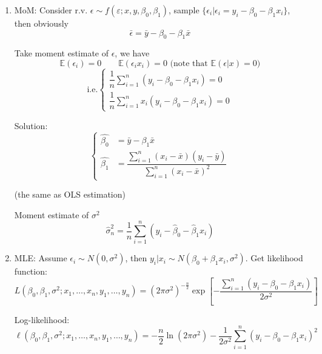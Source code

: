 \begin{enumerate}
    \item MoM: Consider r.v. $\epsilon\sim f(\varepsilon;x,y,\beta_0,\beta_1)$, sample $\{\epsilon_i|\epsilon_i=y_i-\beta_0-\beta_1x_i\}$, then obviously
        \begin{equation}\bar{\epsilon}=\bar{y}-\beta_0-\beta_1\bar{x}\end{equation}

        Take moment estimate of $\epsilon$, we have 
        \begin{equation}\mathbb{E}(\epsilon_i)=0\qquad \mathbb{E}(\epsilon_i x_i)=0\text{ (note that }\mathbb{E}(\epsilon|x)=0)\end{equation}
        \begin{equation}\text{i.e.}\begin{cases}
            
            \dfrac{1}{n}\sum_{i=1}^n(y_i-\beta_0-\beta_1x_i)=0\\
            \dfrac{1}{n}\sum_{i=1}^nx_i(y_i-\beta_0-\beta_1x_i)=0
        \end{cases}\end{equation}

        Solution:
        \begin{equation}\begin{cases}
            \hat{\beta_0}&=\bar{y}-\beta_1\bar{x}\\
            \hat{\beta_1}&=\dfrac{\sum_{i=1}^n(x_i-\bar{x})(y_i-\bar{y})}{\sum_{i=1}^n(x_i-\bar{x})^2}
        \end{cases}\end{equation}

        (the same as OLS estimation)

        Moment estimate of $\sigma^2$
        \begin{equation}\hat{\sigma}^2_n=\frac{1}{n}\sum_{i=1}^n(y_i-\hat{\beta}_0-\hat{\beta}_1x_i)\end{equation}

    \item MLE: Assume $\epsilon_i\sim N(0,\sigma^2)$, then $y_i|x_i\sim N(\beta_0+\beta_1x_i,\sigma^2)$. Get likelihood function:
        \begin{equation}
            L(\beta_0,\beta_1,\sigma^2;x_1,\ldots,x_n,y_1,\ldots,y_n)=(2\pi\sigma^2)^{-\frac{n}{2}}\exp\left[-\frac{\sum_{i=1}^n(y_i-\beta_0-\beta_1x_i)}{2\sigma^2}\right]  
        \end{equation}

    Log-likelihood:
    \begin{equation}
        \ell(\beta _0,\beta _1,\sigma ^2;x_1,\ldots,x_n,y_1,\ldots,y_n)=-\dfrac{n}{2} \ln(2\pi\sigma ^2)-\dfrac{1}{2\sigma ^2}\sum_{i=1}^n(y_i-\beta _0-\beta _1x_i)^2
    \end{equation}


\end{enumerate}

